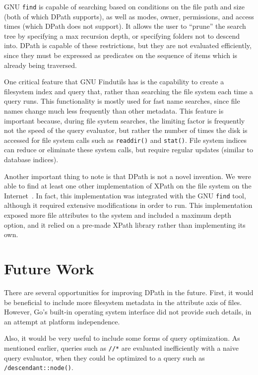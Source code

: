 \documentclass{article}
\begin{document}
GNU \texttt{find} is capable of searching based on conditions on the file path
and size (both of which DPath supports), as well as modes, owner, permissions,
and access times (which DPath does not support). It allows the user to ``prune''
the search tree by specifying a max recursion depth, or specifying folders not
to descend into. DPath is capable of these restrictions, but they are not
evaluated efficiently, since they must be expressed as predicates on the
sequence of items which is already being traversed.

One critical feature that GNU Findutils has is the capability to create a
filesystem index and query that, rather than searching the file system each time
a query runs. This functionality is mostly used for fast name searches, since
file names change much less frequently than other metadata. This feature is
important because, during file system searches, the limiting factor is
frequently not the speed of the query evaluator, but rather the number of times
the disk is accessed for file system calls such as \texttt{readdir()} and
\texttt{stat()}. File system indices can reduce or eliminate these system calls,
but require regular updates (similar to database indices).

Another important thing to note is that DPath is not a novel invention. We were
able to find at least one other implementation of XPath on the file system on
the Internet~\cite{other}. In fact, this implementation was integrated with the
GNU \texttt{find} tool, although it required extensive modifications in order to
run. This implementation exposed more file attributes to the system and included
a maximum depth option, and it relied on a pre-made XPath library rather than
implementing its own.

\section{Future Work}
\label{sec:future}

There are several opportunities for improving DPath in the future. First, it
would be beneficial to include more filesystem metadata in the attribute axis of
files. However, Go's built-in operating system interface did not provide such
details, in an attempt at platform independence.

Also, it would be very useful to include some forms of query optimization. As
mentioned earlier, queries such as \texttt{//*} are evaluated inefficiently with
a naive query evaluator, when they could be optimized to a query such as
\texttt{/descendant::node()}.
\end{document}
